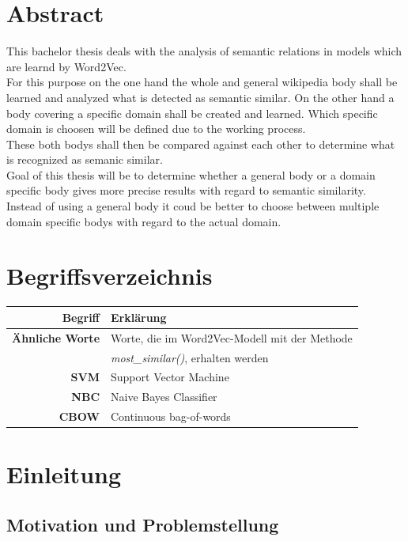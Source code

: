 \documentclass[12pt,a4paper]{report}
\begin{document}
\chapter*{Abstract}
This bachelor thesis deals with the analysis of semantic relations in models which are learnd by Word2Vec.\\
For this purpose on the one hand the whole and general wikipedia body shall be learned and analyzed what is detected as semantic similar. On the other hand a body covering a specific domain shall be created and learned. Which specific domain is choosen will be defined due to the working process.\\
These both bodys shall then be compared against each other to determine what is recognized as semanic similar.\\
Goal of this thesis will be to determine whether a general body or a domain specific body gives more precise results with regard to semantic similarity. Instead of using a general body it coud be better to choose between multiple domain specific bodys with regard to the actual domain.

\newpage
\tableofcontents
\newpage
\chapter*{Begriffsverzeichnis}
	\begin{tabular}{r|l}	
	\textbf{Begriff} & Erklärung\\
	\hline	
	\textbf{Ähnliche Worte} & Worte, die im Word2Vec-Modell mit der Methode\\
	&  \textit{most\_similar()}, erhalten werden\\
	\textbf{SVM} & Support Vector Machine\\
	\textbf{NBC} & Naive Bayes Classifier\\
	\textbf{CBOW} & Continuous bag-of-words\\

\end{tabular}
\newpage
{}
\chapter{Einleitung}
	\section{Motivation und Problemstellung}
	  
\end{document}
